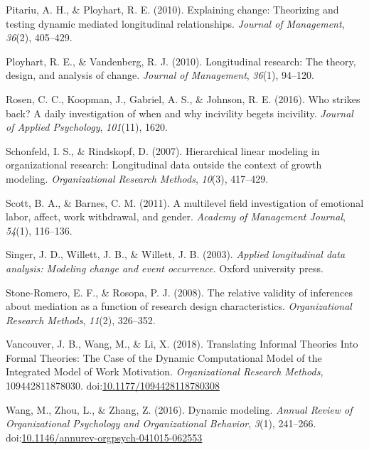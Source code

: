 \documentclass[english,,man]{apa6}
\theoremstyle{definition}
\theoremstyle{definition}
\theoremstyle{definition}
\theoremstyle{remark}
\begin{document}
\leavevmode\hypertarget{ref-pitariu_explaining_2010}{}%
Pitariu, A. H., \& Ployhart, R. E. (2010). Explaining change: Theorizing
and testing dynamic mediated longitudinal relationships. \emph{Journal
of Management}, \emph{36}(2), 405--429.

\leavevmode\hypertarget{ref-ployhart_longitudinal_2010}{}%
Ployhart, R. E., \& Vandenberg, R. J. (2010). Longitudinal research: The
theory, design, and analysis of change. \emph{Journal of Management},
\emph{36}(1), 94--120.

\leavevmode\hypertarget{ref-rosen_who_2016}{}%
Rosen, C. C., Koopman, J., Gabriel, A. S., \& Johnson, R. E. (2016). Who
strikes back? A daily investigation of when and why incivility begets
incivility. \emph{Journal of Applied Psychology}, \emph{101}(11), 1620.

\leavevmode\hypertarget{ref-schonfeld2007hierarchical}{}%
Schonfeld, I. S., \& Rindskopf, D. (2007). Hierarchical linear modeling
in organizational research: Longitudinal data outside the context of
growth modeling. \emph{Organizational Research Methods}, \emph{10}(3),
417--429.

\leavevmode\hypertarget{ref-scott_multilevel_2011}{}%
Scott, B. A., \& Barnes, C. M. (2011). A multilevel field investigation
of emotional labor, affect, work withdrawal, and gender. \emph{Academy
of Management Journal}, \emph{54}(1), 116--136.

\leavevmode\hypertarget{ref-singer_applied_2003}{}%
Singer, J. D., Willett, J. B., \& Willett, J. B. (2003). \emph{Applied
longitudinal data analysis: Modeling change and event occurrence}.
Oxford university press.

\leavevmode\hypertarget{ref-stone2008relative}{}%
Stone-Romero, E. F., \& Rosopa, P. J. (2008). The relative validity of
inferences about mediation as a function of research design
characteristics. \emph{Organizational Research Methods}, \emph{11}(2),
326--352.

\leavevmode\hypertarget{ref-vancouver_translating_2018}{}%
Vancouver, J. B., Wang, M., \& Li, X. (2018). Translating Informal
Theories Into Formal Theories: The Case of the Dynamic Computational
Model of the Integrated Model of Work Motivation. \emph{Organizational
Research Methods}, 109442811878030.
doi:\href{https://doi.org/10.1177/1094428118780308}{10.1177/1094428118780308}

\leavevmode\hypertarget{ref-Wang2016}{}%
Wang, M., Zhou, L., \& Zhang, Z. (2016). Dynamic modeling. \emph{Annual
Review of Organizational Psychology and Organizational Behavior},
\emph{3}(1), 241--266.
doi:\href{https://doi.org/10.1146/annurev-orgpsych-041015-062553}{10.1146/annurev-orgpsych-041015-062553}
\end{document}
